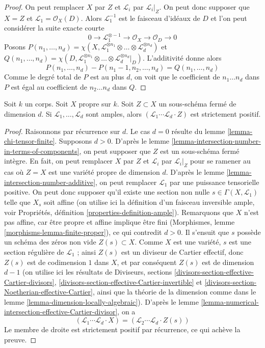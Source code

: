 \begin{proof}
On peut remplacer $X$ par $Z$ et $\mathcal{L}_i$ par $\mathcal{L}_i|_Z$.
On peut donc supposer que $X = Z$ et $\mathcal{L}_1 = \mathcal{O}_X(D)$.
Alors $\mathcal{L}_1^{-1}$ est le faisceau d'idéaux de $D$ et l'on peut
considérer la suite exacte courte
$$
0 \to \mathcal{L}_1^{\otimes -1} \to \mathcal{O}_X \to \mathcal{O}_D \to 0
$$
Posons
$P(n_1, \ldots, n_d) =
\chi(X, \mathcal{L}_1^{\otimes n_1} \otimes \ldots \otimes
\mathcal{L}_d^{\otimes n_d})$
et
$Q(n_1, \ldots, n_d) =
\chi(D, \mathcal{L}_1^{\otimes n_1} \otimes \ldots \otimes
\mathcal{L}_d^{\otimes n_d}|_D)$.
L'additivité donne alors
$$
P(n_1, \ldots, n_d) - P(n_1 - 1, n_2, \ldots, n_d) =
Q(n_1, \ldots, n_d)
$$
Comme le degré total de $P$ est au plus $d$, on voit que
le coefficient de $n_1 \ldots n_d$ dans $P$ est égal au coefficient
de $n_2 \ldots n_d$ dans $Q$.
\end{proof}

\begin{lemma}
\label{lemma-ample-positive}
Soit $k$ un corps. Soit $X$ propre sur $k$. Soit $Z \subset X$ un
sous-schéma fermé de dimension $d$. Si $\mathcal{L}_1, \ldots, \mathcal{L}_d$
sont amples, alors $(\mathcal{L}_1 \cdots \mathcal{L}_d \cdot Z)$ est strictement positif.
\end{lemma}

\begin{proof}
Raisonnons par récurrence sur $d$. Le cas $d = 0$
résulte du lemme \ref{lemma-chi-tensor-finite}. Supposons $d > 0$.
D'après le lemme \ref{lemma-intersection-number-in-terms-of-components},
on peut supposer que $Z$ est un sous-schéma fermé intègre.
En fait, on peut remplacer $X$ par $Z$ et $\mathcal{L}_i$
par $\mathcal{L}_i|_Z$ pour se ramener au cas où $Z = X$ est une
variété propre de dimension $d$.
D'après le lemme \ref{lemma-intersection-number-additive},
on peut remplacer $\mathcal{L}_1$ par une puissance tensorielle positive.
On peut donc supposer qu'il existe une section non nulle
$s \in \Gamma(X, \mathcal{L}_1)$
telle que $X_s$ soit affine (on utilise ici la définition d'un
faisceau inversible ample, voir
Propriétés, définition \ref{properties-definition-ample}).
Remarquons que $X$ n'est pas affine, car être propre et affine
implique être fini (Morphismes, lemme \ref{morphisms-lemma-finite-proper}),
ce qui contredit $d > 0$. Il s'ensuit que $s$ possède un schéma des zéros non vide
$Z(s) \subset X$. Comme $X$ est une variété, $s$ est une section régulière
de $\mathcal{L}_1$ ; ainsi $Z(s)$ est un diviseur de Cartier effectif,
donc $Z(s)$ est de codimension $1$ dans $X$, et
par conséquent $Z(s)$ est de dimension $d - 1$ (on utilise ici les résultats de
Diviseurs, sections \ref{divisors-section-effective-Cartier-divisors},
\ref{divisors-section-effective-Cartier-invertible} et
\ref{divisors-section-Noetherian-effective-Cartier},
ainsi que la théorie de la dimension comme dans le lemme \ref{lemma-dimension-locally-algebraic}).
D'après le lemme \ref{lemma-numerical-intersection-effective-Cartier-divisor},
on a
$$
(\mathcal{L}_1 \cdots \mathcal{L}_d \cdot X) =
(\mathcal{L}_2 \cdots \mathcal{L}_d \cdot Z(s))
$$
Le membre de droite est strictement positif par récurrence, ce qui achève la preuve.
\end{proof}

